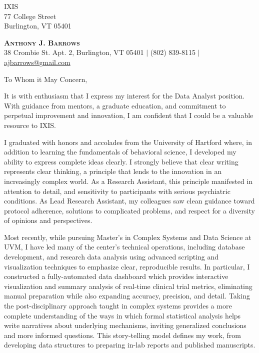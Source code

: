 \documentclass[]{letter}
\begin{document}
\begin{letter}{IXIS \\ 77 College Street \\ Burlington, VT 05401}
	
	\begin{center}
		\textbf{\Huge \scshape Anthony J. Barrows} \\ \vspace{3pt}
		\small 38 Crombie St. Apt. 2, Burlington, VT 05401 $|$
		\small (802) 839-8115 $|$
		\href{mailto:ajbarrows@gmail.com}{ajbarrows@gmail.com}
	\end{center}
\opening{To Whom it May Concern,}
It is with enthusiasm that I express my interest for the Data Analyst position. With guidance from mentors, a graduate education, and commitment to perpetual improvement and innovation, I am confident that I could be a valuable resource to IXIS.

I graduated with honors and accolades from the University of Hartford where, in addition to learning the fundamentals of behavioral science, I developed my ability to express complete ideas clearly. I strongly believe that clear writing represents clear thinking, a principle that lends to the innovation in an increasingly complex world. As a Research Assistant, this principle manifested in attention to detail, and sensitivity to participants with serious psychiatric conditions. As Lead Research Assistant, my colleagues saw clean guidance toward protocol adherence, solutions to complicated problems, and respect for a diversity of opinions and perspectives.

Most recently, while pursuing Master's in Complex Systems and Data Science at UVM, I have led many of the center's technical operations, including database development, and research data analysis using advanced scripting and visualization techniques to emphasize clear, reproducible results. In particular, I constructed a fully-automated data dashboard which provides interactive visualization and summary analysis of real-time clinical trial metrics, eliminating manual preparation while also expanding accuracy, precision, and detail. Taking the post-disciplinary approach taught in complex systems provides a more complete understanding of the ways in which formal statistical analysis helps write narratives about underlying mechanisms, inviting generalized conclusions and more informed questions. This story-telling model defines my work, from developing data structures to preparing in-lab reports and published manuscripts.


\end{letter}
\end{document}
